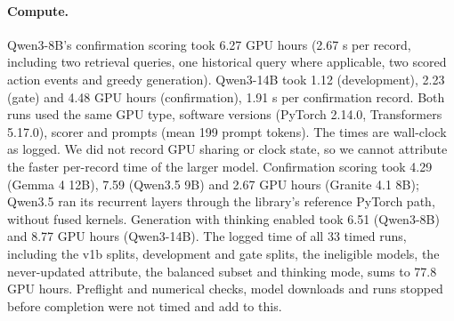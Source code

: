 \paragraph{Compute.} Qwen3-8B's confirmation scoring took 6.27 GPU hours (2.67 s per record, including two
retrieval queries, one historical query where applicable, two scored action events and greedy
generation). Qwen3-14B took 1.12 (development), 2.23 (gate) and 4.48 GPU hours (confirmation), 1.91 s per
confirmation record. Both runs used the same GPU type, software versions (PyTorch 2.14.0, Transformers
5.17.0), scorer and prompts (mean 199 prompt tokens). The times are wall-clock as logged. We did not record
GPU sharing or clock state, so we cannot attribute the faster per-record time of the larger model.
Confirmation scoring took 4.29 (Gemma 4 12B), 7.59 (Qwen3.5 9B) and 2.67 GPU hours (Granite 4.1 8B); Qwen3.5
ran its recurrent layers through the library's reference PyTorch path, without fused kernels. Generation
with thinking enabled took 6.51 (Qwen3-8B) and 8.77 GPU hours (Qwen3-14B). The logged time of all 33 timed
runs, including the v1b splits, development and gate splits, the ineligible models, the never-updated
attribute, the balanced subset and thinking mode, sums to 77.8 GPU hours. Preflight and numerical checks,
model downloads and runs stopped before completion were not timed and add to this.
